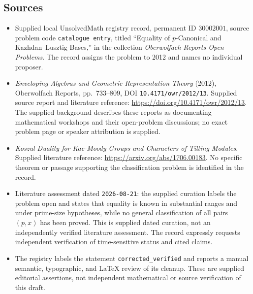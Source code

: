 \documentclass[11pt]{article}
\begin{document}
\subsection{Sources}
\begin{itemize}
\item Supplied local UnsolvedMath registry record, permanent ID \(30002001\), source problem code \texttt{catalogue entry}, titled ``Equality of \(p\)-Canonical and Kazhdan--Lusztig Bases,'' in the collection \emph{Oberwolfach Reports Open Problems}. The record assigns the problem to 2012 and names no individual proposer.
\item \emph{Enveloping Algebras and Geometric Representation Theory} (2012), Oberwolfach Reports, pp.\ 733--809, DOI \texttt{10.4171/owr/2012/13}. Supplied source report and literature reference: \url{https://doi.org/10.4171/owr/2012/13}. The supplied background describes these reports as documenting mathematical workshops and their open-problem discussions; no exact problem page or speaker attribution is supplied.
\item \emph{Koszul Duality for Kac-Moody Groups and Characters of Tilting Modules}. Supplied literature reference: \url{https://arxiv.org/abs/1706.00183}. No specific theorem or passage supporting the classification problem is identified in the record.
\item Literature assessment dated \texttt{2026-08-21}: the supplied curation labels the problem open and states that equality is known in substantial ranges and under prime-size hypotheses, while no general classification of all pairs \((p,x)\) has been proved. This is supplied dated curation, not an independently verified literature assessment. The record expressly requests independent verification of time-sensitive status and cited claims.
\item The registry labels the statement \texttt{corrected\_verified} and reports a manual semantic, typographic, and LaTeX review of its cleanup. These are supplied editorial assertions, not independent mathematical or source verification of this draft.
\end{itemize}
\end{document}
